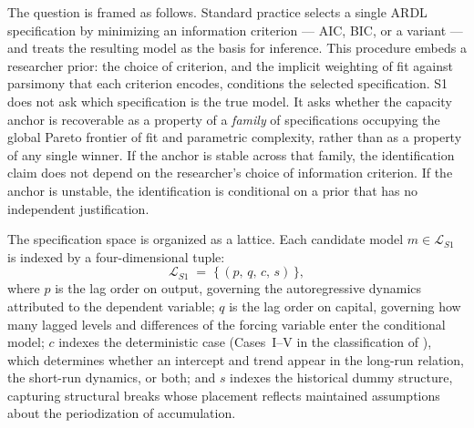 \documentclass[11pt,a4paper]{article}
\begin{document}
The question is framed as follows. Standard practice selects a single ARDL
specification by minimizing an information criterion --- AIC, BIC, or a
variant --- and treats the resulting model as the basis for inference. This
procedure embeds a researcher prior: the choice of criterion, and the
implicit weighting of fit against parsimony that each criterion encodes,
conditions the selected specification. S1 does not ask which specification is
the true model. It asks whether the capacity anchor is recoverable as a
property of a \emph{family} of specifications occupying the global Pareto
frontier of fit and parametric complexity, rather than as a property of any
single winner. If the anchor is stable across that family, the identification
claim does not depend on the researcher's choice of information criterion. If
the anchor is unstable, the identification is conditional on a prior that has
no independent justification.


The specification space is organized as a lattice. Each candidate model
$m \in \mathcal{L}_{S1}$ is indexed by a four-dimensional tuple:
%
\begin{equation}
	\label{eq:S1_lattice}
	\mathcal{L}_{S1} \;=\; \bigl\{\,(p,\, q,\, c,\, s)\,\bigr\},
\end{equation}
%
where $p$ is the lag order on output, governing the autoregressive dynamics
attributed to the dependent variable; $q$ is the lag order on capital,
governing how many lagged levels and differences of the forcing variable enter
the conditional model; $c$ indexes the deterministic case (Cases~I--V in the
classification of \citealt{Pesaran2001}), which determines whether
an intercept and trend appear in the long-run relation, the short-run
dynamics, or both; and $s$ indexes the historical dummy structure, capturing
structural breaks whose placement reflects maintained assumptions about the
periodization of accumulation.

\end{document}
